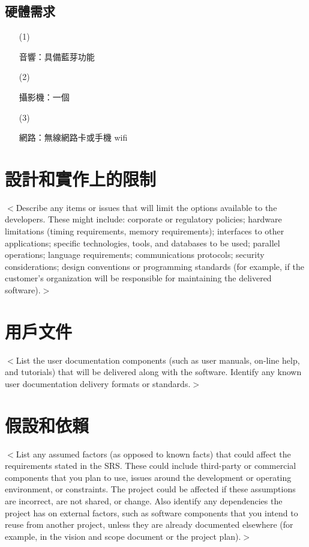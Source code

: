 \documentclass[12pt]{scrreprt}
\begin{document}
\subsection{硬體需求}
\begin{itemize}
\item[(1)]{\begin{bfseries}{音響：}具備藍芽功能\end{bfseries}}
\item[(2)]{\begin{bfseries}{攝影機：}一個\end{bfseries}}
\item[(3)]{\begin{bfseries}{網路：}無線網路卡或手機 wifi\end{bfseries}}

\end{itemize}

\section{設計和實作上的限制}
$<$Describe any items or issues that will limit the options available to the 
developers. These might include: corporate or regulatory policies; hardware 
limitations (timing requirements, memory requirements); interfaces to other 
applications; specific technologies, tools, and databases to be used; parallel 
operations; language requirements; communications protocols; security 
considerations; design conventions or programming standards (for example, if the 
customer’s organization will be responsible for maintaining the delivered 
software).$>$

\section{用戶文件}
$<$List the user documentation components (such as user manuals, on-line help, 
and tutorials) that will be delivered along with the software. Identify any 
known user documentation delivery formats or standards.$>$
\section{假設和依賴}

$<$List any assumed factors (as opposed to known facts) that could affect the 
requirements stated in the SRS. These could include third-party or commercial 
components that you plan to use, issues around the development or operating 
environment, or constraints. The project could be affected if these assumptions 
are incorrect, are not shared, or change. Also identify any dependencies the 
project has on external factors, such as software components that you intend to 
reuse from another project, unless they are already documented elsewhere (for 
example, in the vision and scope document or the project plan).$>$
\end{document}
